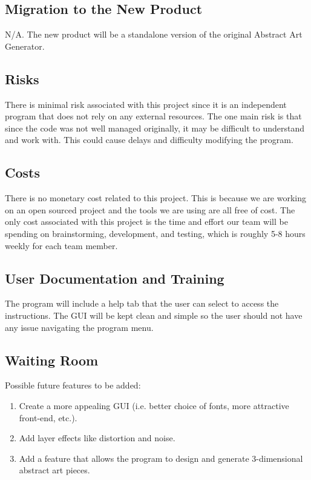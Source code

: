 \documentclass[12pt, titlepage]{article}
\begin{document}
\subsection{Migration to the New Product}

N/A. The new product will be a standalone version of the original Abstract Art Generator.

\subsection{Risks}

There is minimal risk associated with this project since it is an independent program that does not rely on any external resources. The one main risk is that since the code was not well managed originally, it may be difficult to understand and work with. This could cause delays and difficulty modifying the program. 

\subsection{Costs}

There is no monetary cost related to this project. This is because we are working on an open sourced project and the tools we are using are all free of cost. The only cost associated with this project is the time and effort our team will be spending on brainstorming, development, and testing, which is roughly 5-8 hours weekly for each team member.

\subsection{User Documentation and Training}

The program will include a help tab that the user can select to access the instructions. The GUI will be kept clean and simple so the user should not have any issue navigating the program menu.

\subsection{Waiting Room}

Possible future features to be added:

\begin{enumerate}
    \item Create a more appealing GUI (i.e. better choice of fonts, more attractive front-end, etc.).
    \item Add layer effects like distortion and noise.
    \item Add a feature that allows the program to design and generate 3-dimensional abstract art pieces.
\end{enumerate}
\end{document}
